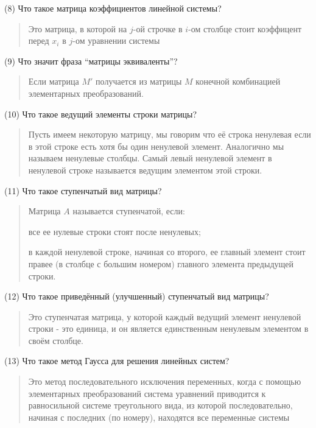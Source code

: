\documentclass{article}
\begin{document}
(8) Что такое матрица коэффициентов линейной системы? 
\begin{quote}
        Это матрица, в которой на $j$-ой строчке в $i$-ом столбце стоит коэффицент перед $x_i$ в $j$-ом уравнении системы
\end{quote}

(9) Что значит фраза “матрицы эквиваленты”? 
\begin{quote}
   Если матрица $M'$ получается из матрицы $M$ конечной комбинацией элементарных преобразований.
\end{quote}

(10) Что такое ведущий элементы строки матрицы? 
\begin{quote}
    Пусть имеем некоторую матрицу, мы говорим что её строка ненулевая если в этой строке есть хотя бы один ненулевой элемент. Аналогично мы называем ненулевые столбцы. Самый левый ненулевой элемент в ненулевой строке называется ведущим элементом этой строки.
\end{quote}

(11) Что такое ступенчатый вид матрицы? 
\begin{quote}
   Матрица $A$ называется ступенчатой, если:
   
   все ее нулевые строки стоят после ненулевых; 
   
   в каждой ненулевой строке, начиная со второго, ее главный элемент стоит правее (в столбце с большим номером) главного элемента предыдущей строки. 
\end{quote}

(12) Что такое приведённый (улучшенный) ступенчатый вид матрицы? 
\begin{quote}
Это ступенчатая матрица, у которой каждый ведущий элемент ненулевой строки - это единица, и он является единственным ненулевым элементом в своём столбце. 
\end{quote}

(13) Что такое метод Гаусса для решения линейных систем? 
\begin{quote}
    Это метод последовательного исключения переменных, когда с помощью элементарных преобразований система уравнений приводится к равносильной системе треугольного вида, из которой последовательно, начиная с последних (по номеру), находятся все переменные системы 
\end{quote}
\end{document}
